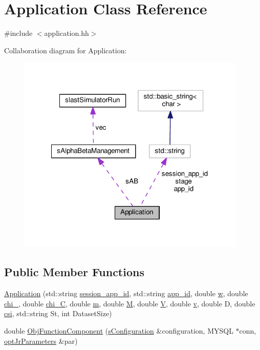 \hypertarget{classApplication}{\section{Application Class Reference}
\label{classApplication}
}


{\ttfamily \#include $<$application.\-hh$>$}



Collaboration diagram for Application\-:\nopagebreak
\begin{figure}[H]
\begin{center}
\leavevmode
\includegraphics[width=309pt]{classApplication__coll__graph}
\end{center}
\end{figure}
\subsection*{Public Member Functions}
\begin{DoxyCompactItemize}
\item 
\hyperlink{classApplication_aa660e2135b162cfddaca0918be8599e8}{Application} (std\-::string \hyperlink{classApplication_a5e28ffadb86925ecae57ab18c0085d90}{session\-\_\-app\-\_\-id}, std\-::string \hyperlink{classApplication_a05377e6cdcb9d48f29e0f1972a4a16fe}{app\-\_\-id}, double \hyperlink{classApplication_aead1b7b0150c2a3ebd6c36b1db8c4732}{w}, double \hyperlink{classApplication_a3b9dab40d189989c836b8d328946bbb6}{chi\-\_}, double \hyperlink{classApplication_a46e29a6bfc74de610feec809a77dfb62}{chi\-\_\-\-C}, double \hyperlink{classApplication_ab903d83d3cde51569a27f97752c9f158}{m}, double \hyperlink{classApplication_a14904a2abf46cc0a50eb82043fa0912e}{M}, double \hyperlink{classApplication_aa92ad37e6701931176e0dc9b260fd7ee}{V}, double \hyperlink{classApplication_a9efc167094a42382504dd28a7ac402e0}{v}, double D, double \hyperlink{classApplication_a20adc533c6b6147342b3f60dc0fbd9bc}{csi}, std\-::string St, int Dataset\-Size)
\item 
double \hyperlink{classApplication_a97054cee52b315da040098c3927c909e}{Obj\-Function\-Component} (\hyperlink{readConfigurationFile_8hh_ab8f35b1da3261263c5e9c0e7c8921f5c}{s\-Configuration} \&configuration, M\-Y\-S\-Q\-L $\ast$conn, \hyperlink{classoptJrParameters}{opt\-Jr\-Parameters} \&par)
\end{DoxyCompactItemize}
